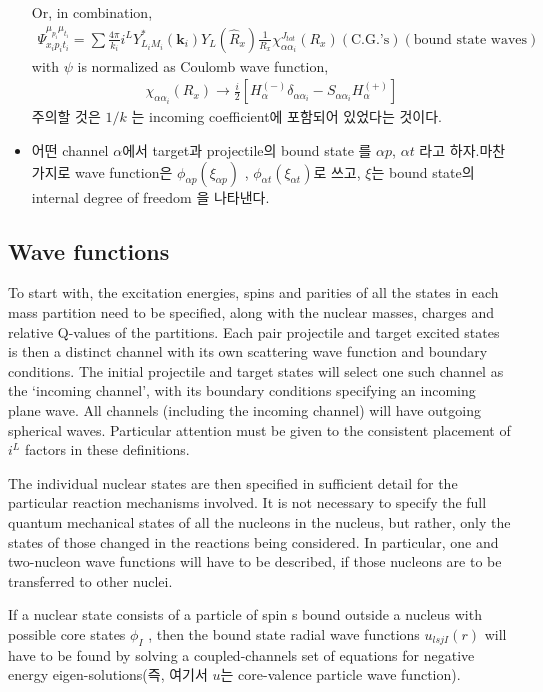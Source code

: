 \documentclass[11pt]{book}
\def\bm{\boldsymbol}
\def\vk{{\bm k}}
\newcommand{\bea}{\begin{eqnarray}}
\newcommand{\eea}{\end{eqnarray}}
\begin{document}
\begin{itemize}
Or, in combination,
\bea 
\Psi_{x_ip_it_i}^{\mu_{p_i}\mu_{t_i}}
= \sum \frac{4\pi}{k_i} i^{L} Y^*_{L_iM_i}(\vk_i) Y_{L}(\hat{R}_x)
    \frac{1}{R_x}\chi_{\alpha\alpha_i}^{J_{tot}}(R_x)
        (\mbox{C.G.'s})(\mbox{bound state waves})
\eea 
with $\psi$ is normalized as Coulomb wave function,
\bea 
\chi_{\alpha\alpha_i}(R_x)\to 
\frac{i}{2}[H_\alpha^{(-)}\delta_{\alpha\alpha_i}-S_{\alpha\alpha_i} H_\alpha^{(+)}]
\eea 
주의할 것은 $1/k$ 는 incoming coefficient에 포함되어 있었다는 것이다. 
\item 어떤 channel $\alpha$에서 target과 projectile의 bound state 를 
$\alpha p$, $\alpha t$ 라고 하자.마찬가지로 wave function은 
$\phi_{\alpha p}(\xi_{\alpha p})$ , $\phi_{\alpha t}(\xi_{\alpha t})$로 쓰고,
$\xi$는 bound state의 internal degree of freedom 을 나타낸다. 
\end{itemize}

\subsection{Wave functions}
To start with, the 
{\color{blue} excitation
energies, spins and parities of all the states in each mass partition} need to be specified, along
with 
{\color{blue}
the nuclear masses, charges and relative Q-values of the partitions. 
Each pair projectile
and target excited states is then a distinct channel with its own scattering wave function and  boundary conditions}. 
The initial projectile and target states will select one such channel as the
‘incoming channel’, with its boundary conditions specifying an incoming plane wave. 
All channels
(including the incoming channel) will have outgoing spherical waves. Particular attention
must be given to the consistent placement of $i^L$ factors in these definitions.

The individual nuclear states are then specified in sufficient detail for the particular reaction
mechanisms involved. 
It is not necessary to specify the full quantum mechanical states of all
the nucleons in the nucleus, but rather, 
only the states of those changed in the reactions being
considered. 
In particular, {\color{blue} one and two-nucleon wave functions} will have to be described, if those
nucleons are to be transferred to other nuclei. 

If a nuclear state consists of a particle of spin s
bound outside a nucleus with possible core states $\phi_I$ , 
then the {\color{blue} bound state radial wave functions
$u_{lsjI}(r)$ will have to be found 
by solving a coupled-channels set of equations for negative energy
eigen-solutions}(즉, 여기서 $u$는 core-valence particle wave function). 
\end{document}
